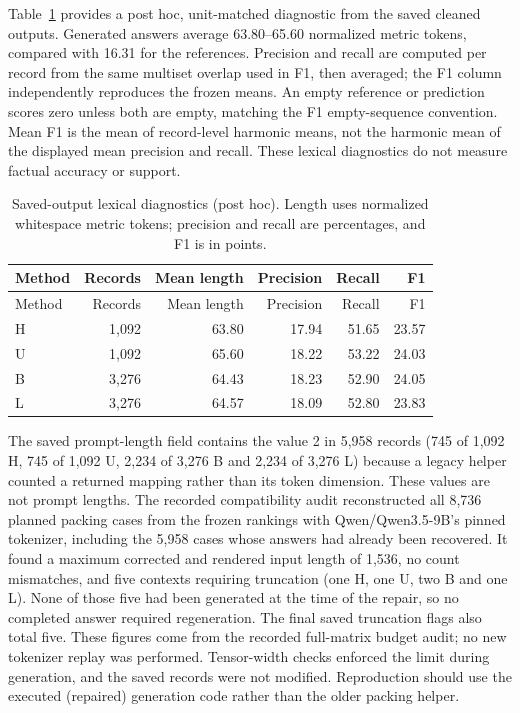Table~\ref{tab:lexical} provides a post hoc, unit-matched diagnostic from the saved cleaned outputs. Generated answers average 63.80--65.60 normalized metric tokens, compared with 16.31 for the references. Precision and recall are computed per record from the same multiset overlap used in F1, then averaged; the F1 column independently reproduces the frozen means. An empty reference or prediction scores zero unless both are empty, matching the F1 empty-sequence convention. Mean F1 is the mean of record-level harmonic means, not the harmonic mean of the displayed mean precision and recall. These lexical diagnostics do not measure factual accuracy or support.
\begin{longtable}{lrrrrr}
\caption{Saved-output lexical diagnostics (post hoc). Length uses normalized whitespace metric tokens; precision and recall are percentages, and F1 is in points.}\label{tab:lexical}\\
\toprule Method & Records & Mean length & Precision & Recall & F1\\\midrule\endfirsthead
\toprule Method & Records & Mean length & Precision & Recall & F1\\\midrule\endhead
H & 1,092 & 63.80 & 17.94 & 51.65 & 23.57\\
U & 1,092 & 65.60 & 18.22 & 53.22 & 24.03\\
B & 3,276 & 64.43 & 18.23 & 52.90 & 24.05\\
L & 3,276 & 64.57 & 18.09 & 52.80 & 23.83\\\bottomrule
\end{longtable}

\FloatBarrier
The saved prompt-length field contains the value 2 in 5,958 records (745 of 1,092 H, 745 of 1,092 U, 2,234 of 3,276 B and 2,234 of 3,276 L) because a legacy helper counted a returned mapping rather than its token dimension. These values are not prompt lengths. The recorded compatibility audit reconstructed all 8,736 planned packing cases from the frozen rankings with Qwen/Qwen3.5-9B's pinned tokenizer, including the 5,958 cases whose answers had already been recovered. It found a maximum corrected and rendered input length of 1,536, no count mismatches, and five contexts requiring truncation (one H, one U, two B and one L). None of those five had been generated at the time of the repair, so no completed answer required regeneration. The final saved truncation flags also total five. These figures come from the recorded full-matrix budget audit; no new tokenizer replay was performed. Tensor-width checks enforced the limit during generation, and the saved records were not modified. Reproduction should use the executed (repaired) generation code rather than the older packing helper.

